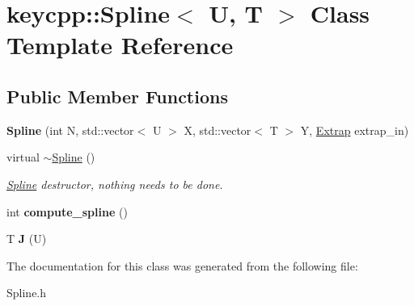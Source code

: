 \hypertarget{classkeycpp_1_1_spline}{\section{keycpp\-:\-:Spline$<$ U, T $>$ Class Template Reference}
\label{classkeycpp_1_1_spline}
}
\subsection*{Public Member Functions}
\begin{DoxyCompactItemize}
\item 
\hypertarget{classkeycpp_1_1_spline_aaf2c271eb0801457ff2769e174e9b833}{{\bfseries Spline} (int N, std\-::vector$<$ U $>$ X, std\-::vector$<$ T $>$ Y, \hyperlink{classkeycpp_1_1_extrap}{Extrap} extrap\-\_\-in)}\label{classkeycpp_1_1_spline_aaf2c271eb0801457ff2769e174e9b833}

\item 
\hypertarget{classkeycpp_1_1_spline_a8d7aaf51fd3a1c48ed43d70b2b9c10fe}{virtual \hyperlink{classkeycpp_1_1_spline_a8d7aaf51fd3a1c48ed43d70b2b9c10fe}{$\sim$\-Spline} ()}\label{classkeycpp_1_1_spline_a8d7aaf51fd3a1c48ed43d70b2b9c10fe}

\begin{DoxyCompactList}\small\item\em \hyperlink{classkeycpp_1_1_spline}{Spline} destructor, nothing needs to be done. \end{DoxyCompactList}\item 
\hypertarget{classkeycpp_1_1_spline_afcd84822df41426f4ea9da070d97b376}{int {\bfseries compute\-\_\-spline} ()}\label{classkeycpp_1_1_spline_afcd84822df41426f4ea9da070d97b376}

\item 
\hypertarget{classkeycpp_1_1_spline_a7fa452b0c1952f0a3e4160f59195d513}{T {\bfseries J} (U)}\label{classkeycpp_1_1_spline_a7fa452b0c1952f0a3e4160f59195d513}

\end{DoxyCompactItemize}


The documentation for this class was generated from the following file\-:\begin{DoxyCompactItemize}
\item 
Spline.\-h\end{DoxyCompactItemize}
